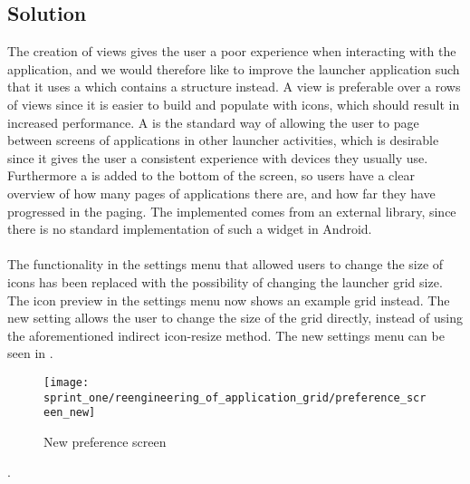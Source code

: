 \subsection{Solution}
\label{sub:reengineering_of_application_grid_solution}
The creation of  views gives the user a poor experience when interacting with the application, and we would therefore like to improve the launcher application such that it uses a  which contains a  structure instead. A  view is preferable over a rows of  views since it is easier to build and populate with icons, which should result in increased performance. A  is the standard way of allowing the user to page between screens of applications in other launcher activities, which is desirable since it gives the user a consistent experience with devices they usually use. Furthermore a  is added to the bottom of the screen, so users have a clear overview of how many pages of applications there are, and how far they have progressed in the paging. The implemented  comes from an external library\parencite{view_pager_indicator_avianey}, since there is no standard implementation of such a widget in Android.
\\\\
The functionality in the settings menu that allowed users to change the size of icons has been replaced with the possibility of changing the launcher grid size. The icon preview in the settings menu now shows an example grid instead. The new setting allows the user to change the size of the grid directly, instead of using the aforementioned indirect icon-resize method. The new settings menu can be seen in .

\begin{figure}[!htbp]
    \centering
    \texttt{[image: sprint\_one/reengineering\_of\_application\_grid/preference\_screen\_new]}
    \caption{New preference screen}
    \label{fig:preference_screen_new}
\end{figure}.